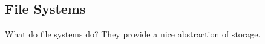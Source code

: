 \documentclass{article}
\begin{document}

\subsection{File Systems}

What do file systems do? They provide a nice abstraction of storage.
\end{document}
